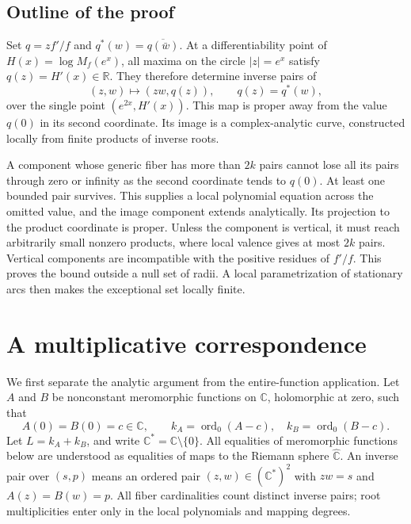 \documentclass[11pt,reqno]{amsart}
\theoremstyle{remark}
\numberwithin{equation}{section}
\newcommand{\C}{\mathbb C}
\newcommand{\R}{\mathbb R}
\newcommand{\Cs}{\C^*}
\newcommand{\Ps}{\widehat{\C}}
\newcommand{\ord}{\operatorname{ord}}
\begin{document}
\subsection*{Outline of the proof}
Set $q=zf'/f$ and $q^*(w)=\overline{q(\bar w)}$.
At a differentiability point of $H(x)=\log M_f(e^x)$, all maxima on the
circle $|z|=e^x$ satisfy $q(z)=H'(x)\in\R$. They therefore determine
inverse pairs of
\[
 (z,w)\longmapsto (zw,q(z)),\qquad q(z)=q^*(w),
\]
over the single point $(e^{2x},H'(x))$.
This map is proper away from the value $q(0)$ in its second coordinate.
Its image is a complex-analytic curve, constructed locally from finite
products of inverse roots.

A component whose generic fiber has more than $2k$ pairs cannot lose
all its pairs through zero or infinity as the second coordinate tends
to $q(0)$. At least one bounded pair survives. This supplies a local
polynomial equation across the omitted value, and the image component
extends analytically. Its projection to the product coordinate is
proper. Unless the component is vertical, it must reach arbitrarily
small nonzero products, where local valence gives at most $2k$ pairs.
Vertical components are incompatible with the positive residues of
$f'/f$. This proves the bound outside a null set of radii. A local
parametrization of stationary arcs then makes the exceptional set
locally finite.

\section{A multiplicative correspondence}\label{sec:correspondence}
We first separate the analytic argument from the entire-function
application. Let $A$ and $B$ be nonconstant meromorphic functions on
$\C$, holomorphic at zero, such that
\begin{equation}\label{eq:generalorigin}
 A(0)=B(0)=c\in\C,
 \qquad k_A=\ord_0(A-c),\quad k_B=\ord_0(B-c).
\end{equation}
Let $L=k_A+k_B$, and write $\Cs=\C\setminus\{0\}$.
All equalities of meromorphic functions below are understood as
equalities of maps to the Riemann sphere $\Ps$.
An inverse pair over $(s,p)$ means an ordered pair $(z,w)\in(\Cs)^2$
with $zw=s$ and $A(z)=B(w)=p$.
All fiber cardinalities count distinct inverse pairs; root
multiplicities enter only in the local polynomials and mapping degrees.
\end{document}
